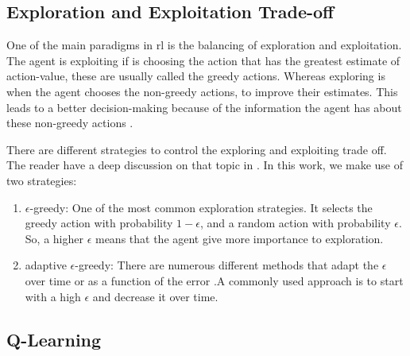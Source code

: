 \subsection{Exploration and Exploitation Trade-off}

One of the main paradigms in \gls{rl} is the balancing of exploration and exploitation.
%
The agent is exploiting if is choosing the action that has the greatest estimate of action-value, these are usually called the greedy actions.
%
Whereas exploring is when the agent chooses the non-greedy actions, to improve their estimates.
%
This leads to a better decision-making because of the information the agent has about these non-greedy actions \cite{sutton2018rl}.
%


There are different strategies to control the exploring and exploiting trade off. The reader have a deep discussion on that topic in \cite{exploration2016}.
%
In this work, we make use of two strategies:
\begin{enumerate}
  \item $\epsilon$-greedy: One of the most common exploration strategies. It selects the greedy action with probability $1-\epsilon$, and a random action with probability $\epsilon$. So, a higher $\epsilon$ means that the agent give more importance to exploration.
  \item adaptive $\epsilon$-greedy: There are numerous different methods that adapt the $\epsilon$ over time or as a function of the error \cite{improvingBandits}.A commonly used approach is to start with a high $\epsilon$ and decrease it over time.
\end{enumerate}


\subsection{Q-Learning}

